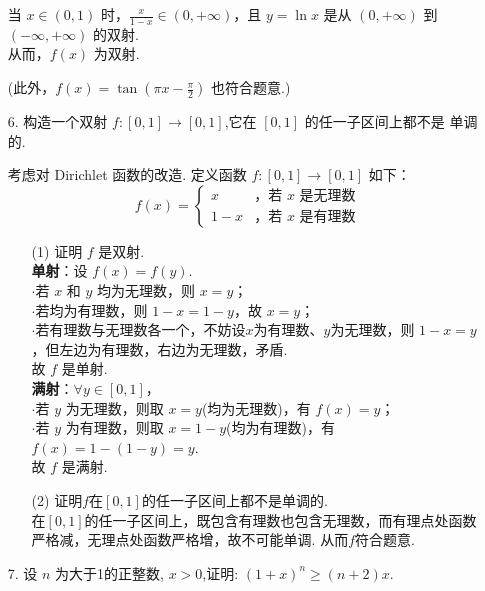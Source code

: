 \begin{enumerate}
\begin{solution}
        当 $x \in (0,1)$ 时，$\displaystyle \frac{x}{1-x} \in (0,+\infty)$，且 $y=\ln{x}$ 是从 $(0, +\infty)$ 到 $(-\infty, +\infty)$ 的双射.\\
        从而，$\displaystyle f(x)$ 为双射.

        (此外，$\displaystyle f(x)=\tan\left(\pi x-\frac{\pi}{2}\right)$ 也符合题意.)
    \end{solution}

    \item[6.]构造一个双射 $f:[0,1]\to [0,1]$,它在 $[0,1]$ 的任一子区间上都不是
    单调的.
    \begin{solution}
        考虑对 Dirichlet 函数的改造. 定义函数 $f: [0,1] \to [0,1]$ 如下：
        \[
        f(x) = 
        \begin{cases}
            x & \text{，若 } x \text{ 是无理数} \\
            1 - x & \text{，若 } x \text{ 是有理数}
        \end{cases}
        \]
        \begin{enumerate}
            \item[(1)]证明 $f$ 是双射.\\
            \textbf{单射}：设 $f(x) = f(y)$.\\
            $\cdot$若 $x$ 和 $y$ 均为无理数，则 $x=y$；\\
            $\cdot$若均为有理数，则 $1-x=1-y$，故 $x=y$；\\
            $\cdot$若有理数与无理数各一个，不妨设$x$为有理数、$y$为无理数，则 $1-x = y$，但左边为有理数，右边为无理数，矛盾.\\
            故 $f$ 是单射.\\
            \textbf{满射}：$\forall y \in [0,1]$，\\
            $\cdot$若 $y$ 为无理数，则取 $x=y$(均为无理数)，有 $f(x)=y$；\\
            $\cdot$若 $y$ 为有理数，则取 $x=1-y$(均为有理数)，有 $f(x)=1-(1-y)=y$.\\
            故 $f$ 是满射.
            \item[(2)]证明$f$在$[0, 1]$的任一子区间上都不是单调的. \\
            在$[0, 1]$的任一子区间上，既包含有理数也包含无理数，而有理点处函数严格减，无理点处函数严格增，故不可能单调. 从而$f$符合题意.
        \end{enumerate}
    \end{solution}

    \item[7.]设 $n$ 为大于1的正整数, $x > 0$,证明: $(1 + x)^{n}\geq (n + 2)x.$


\end{enumerate}
